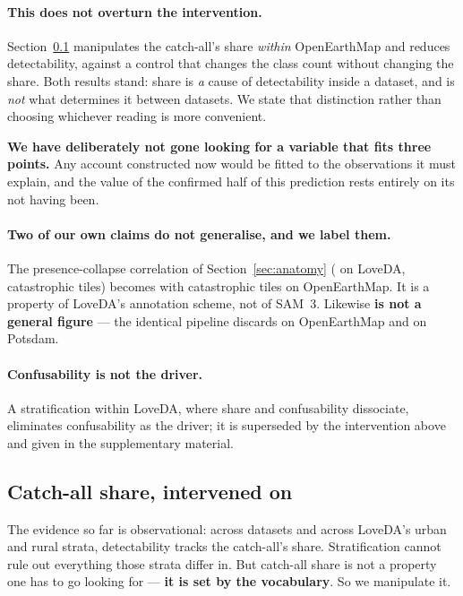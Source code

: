 \documentclass[10pt,a4paper]{article}                        %
\newcommand{\best}[1]{\textbf{#1}}
\newcommand{\suppref}[1]{the supplementary material}
\begin{document}
\paragraph{This does not overturn the intervention.} Section~\ref{sec:intervention}
manipulates the catch-all's share \emph{within} OpenEarthMap and reduces
detectability, against a control that changes the class count without changing the
share. Both results stand: share is \emph{a} cause of detectability inside a
dataset, and is \emph{not} what determines it between datasets. We state that
distinction rather than choosing whichever reading is more convenient.

\best{We have deliberately not gone looking for a variable that fits three
points.} Any account constructed now would be fitted to the observations it must
explain, and the value of the confirmed half of this prediction rests entirely on
its not having been.

\paragraph{Two of our own claims do not generalise, and we label them.} The
presence-collapse correlation of Section~\ref{sec:anatomy} (\presCorrLove{} on
LoveDA, \catTilesLove{} catastrophic tiles) becomes \presCorrOEM{} with
\catTilesOEM{} catastrophic tiles on OpenEarthMap. It is a property of LoveDA's
annotation scheme, not of SAM~3. Likewise \best{\discardPct{} is not a general
figure} --- the identical pipeline discards \discardOEM{} on OpenEarthMap and
\potsDiscard{} on Potsdam.

\paragraph{Confusability is not the driver.} A stratification within LoveDA, where share and confusability dissociate, eliminates confusability as the driver; it is superseded by the intervention above and given in \suppref{sup:confuse}.

\subsection{Catch-all share, intervened on}
\label{sec:intervention}

The evidence so far is observational: across datasets and across LoveDA's urban
and rural strata, detectability tracks the catch-all's share. Stratification
cannot rule out everything those strata differ in. But catch-all share is not a
property one has to go looking for --- \best{it is set by the vocabulary}. So we
manipulate it.
\end{document}
